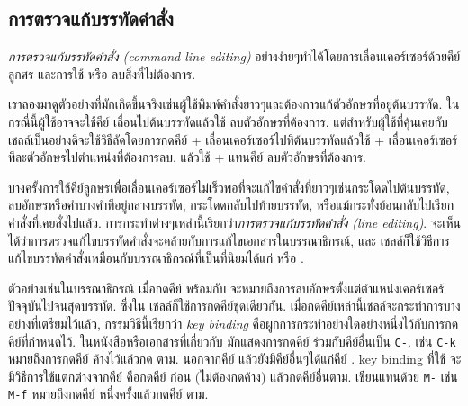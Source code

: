 \begin{thwbr}
\subsection{การตรวจแก้บรรทัดคำสั่ง}
\emph{การตรวจแก้บรรทัดคำสั่ง (command line editing)} อย่างง่ายๆทำได้โดยการเลื่อนเคอร์เซอร์ด้วยคีย์ลูกศร   และการใช้ {\latintext\tt{}} หรือ {\latintext\tt{}} ลบสิ่งที่ไม่ต้องการ. 

เราลองมาดูตัวอย่างที่มักเกิดขึ้นจริงเช่นผู้ใช้พิมพ์คำสั่งยาวๆและต้องการแก้ตัวอักษรที่อยู่ต้นบรรทัด. ในกรณี่นี้ผู้ใช้อาจจะใช้คีย์  เลื่อนไปต้นบรรทัดแล้วใช้  ลบตัวอักษรที่ต้องการ. แต่สำหรับผู้ใช้ที่คุ้นเคยกับเชลล์เป็นอย่างดีจะใช้วิธีลัดโดยการกดคีย์ + เลื่อนเคอร์เซอร์ไปที่ต้นบรรทัดแล้วใช้ + เลื่อนเคอร์เซอร์ทีละตัวอักษรไปตำแหน่งที่ต้องการลบ. แล้วใช้ + แทนคีย์  ลบตัวอักษรที่ต้องการ. 


บางครั้งการใช้คีย์ลูกษรเพื่อเลื่อนเคอร์เซอร์ไม่เร็วพอที่จะแก้ไขคำสั่งที่ยาวๆเช่นกระโดดไปต้นบรรทัด, ลบอักษรหรือคำบางคำทีอยู่กลางบรรทัด, กระโดดกลับไปท้ายบรรทัด, หรือแม้กระทั่งย้อนกลับไปเรียกคำสั่งที่เคยสั่งไปแล้ว. การกระทำต่างๆเหล่านี้เรียกว่า\emph{การตรวจแก้บรรทัดคำสั่ง (line editing)}. จะเห็นได้ว่าการตรวจแก้ไขบรรทัดคำสั่งจะคล้ายกับการแก้ไขเอกสารในบรรณาธิกรณ์, และ  เชลล์ก็ใช้วิธีการแก้ไขบรรทัดคำสั่งเหมือนกับบรรณาธิกรณ์ที่เป็นที่นิยมได้แก่  หรือ . 

ตัวอย่างเช่นในบรรณาธิกรณ์  เมื่อกดคีย์ {\latintext\tt{}} พร้อมกับ {\latintext\tt{}} จะหมายถึงการลบอักษรตั้งแต่ตำแหน่งเคอร์เซอร์ปัจจุบันไปจนสุดบรรทัด. ซึ่งใน  เชลล์ก็ใช้การกดคีย์ชุดเดียวกัน. เมื่อกดคีย์เหล่านี้เชลล์จะกระทำการบางอย่างที่เตรียมไว้แล้ว, กรรมวิธีนี้เรียกว่า \emph{key binding} คือผูกการกระทำอย่างใดอย่างหนึ่งไว้กับการกดคีย์ที่กำหนดไว้. ในหนังสือหรือเอกสารที่เกี่ยวกับ  มักแสดงการกดคีย์ {\latintext\tt{}} ร่วมกับคีย์อื่นเป็น {\latintext\tt C-}. เช่น {\latintext\tt C-k} หมายถึงการกดคีย์ {\latintext\tt{}} ค้างไว้แล้วกด {\latintext\tt{}} ตาม. นอกจากคีย์ {\latintext\tt{}} แล้วยังมีคีย์อื่นๆได้แก่คีย์ {\latintext\tt{}}. key binding ที่ใช้ {\latintext\tt{}} จะมีวิธีการใช้แตกต่างจากคีย์ {\latintext\tt{}} คือกดคีย์ {\latintext\tt{}} ก่อน (ไม่ต้องกดค้าง) แล้วกดคีย์อื่นตาม. เขียนแทนด้วย {\latintext\tt M-} เช่น {\latintext\tt M-f} หมายถึงกดคีย์ {\latintext\tt{}} หนึ่งครั้งแล้วกดคีย์ {\latintext\tt{}} ตาม. 


\end{thwbr}
